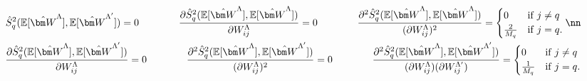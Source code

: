 \begin{gather}
\hat{S}^2_q(\mathbb{E}[\hat{\bm W}^\Lambda], \mathbb{E}[\hat{\bm W}^{\Lambda'}]) = 0 \qquad \qquad \frac{\partial \hat{S}^2_q(\mathbb{E}[\hat{\bm W}^\Lambda], \mathbb{E}[\hat{\bm W}^{\Lambda}]) }{\partial W_{ij}^\Lambda} = 0
\qquad \qquad  \frac{\partial^2 \hat{S}^2_q(\mathbb{E}[\hat{\bm W}^\Lambda], \mathbb{E}[\hat{\bm W}^{\Lambda}])}{(\partial W_{ij}^\Lambda)^2} = \begin{cases}
0 & {\rm if} \; j \neq q \\
\frac{2}{M_q} & {\rm if}\; j = q.
\end{cases} \nn \\ 
\frac{\partial \hat{S}^2_q(\mathbb{E}[\hat{\bm W}^\Lambda], \mathbb{E}[\hat{\bm W}^{\Lambda'}]) }{\partial W_{ij}^\Lambda} = 0 \qquad \qquad  \frac{\partial^2 \hat{S}^2_q(\mathbb{E}[\hat{\bm W}^\Lambda], \mathbb{E}[\hat{\bm W}^{\Lambda'}])}{(\partial W_{ij}^\Lambda)^2} = 0 \qquad \qquad 
\frac{\partial^2 \hat{S}^2_q(\mathbb{E}[\hat{\bm W}^\Lambda], \mathbb{E}[\hat{\bm W}^{\Lambda'}])}{(\partial W_{ij}^\Lambda)(\partial W_{ij}^{\Lambda'})} = \begin{cases}
0 & {\rm if} \; j \neq q \\
\frac{1}{M_q} & {\rm if}\; j = q.
\end{cases} 
\label{eq: variance estimator derivatives expectation}
\end{gather}

